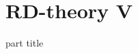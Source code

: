 
\DeclareMathOperator{\cwd}{codeword}
\newtheorem{proposition}{Proposition}
\usepackage{forest}
\usepackage{lipsum}
\usepackage{subcaption}
\usepackage{mathtools}


\section{RD-theory V} 
\begin{frame}
 \vspace{12.0ex}
\begin{center}
\begin{beamercolorbox}[sep=12pt,center]{part title}
\insertsection\par
\end{beamercolorbox}
\end{center}
\end{frame}





